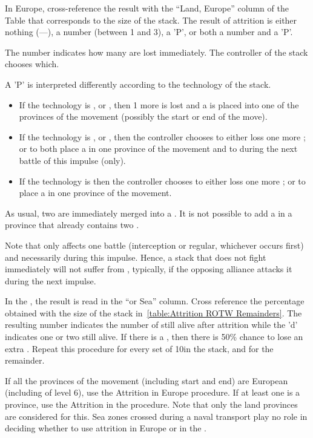 In Europe, cross-reference the result with the ``Land, Europe'' column of the
Table that corresponds to the size of the stack. The result of attrition is
either nothing (---), a number (between 1 and 3), a 'P', or both a number and
a 'P'.

The number indicates how many \LD are lost immediately. The controller of the
stack chooses which.

A 'P' is interpreted differently according to the technology of the stack.
\begin{itemize}
\item If the technology is \TMED, \TREN or \TARQ, then 1 more \LD is lost and
  a \PILLAGE\facemoins is placed into one of the provinces of the movement
  (possibly the start or end of the move).
\item If the technology is \TMUS, \TBAR or \TMAN, then the controller chooses
  to either loss one more \LD; or to both place a \PILLAGE\facemoins in one
  province of the movement and to  during the next battle of
  this impulse (only).
\item If the technology is \TL then the controller chooses
  to either loss one more \LD; or to place a \PILLAGE\facemoins in one
  province of the movement.
\end{itemize}
As usual, two \PILLAGE\Facemoins are immediately merged into a
\PILLAGE\Faceplus. It is not possible to add a \PILLAGE in a province that
already contains two \PILLAGE\Faceplus.

Note that  only affects one battle (interception or regular,
whichever occurs first) and necessarily during this impulse. Hence, a stack
that does not fight immediately will not suffer from ,
typically, if the opposing alliance attacks it during the next impulse.

\smallskip

In the \ROTW, the result is read in the ``\ROTW or Sea'' column. Cross
reference the percentage obtained with the size of the stack
in~\ref{table:Attrition ROTW Remainders}. The resulting number indicates the
number of \LD still alive after attrition while the 'd' indicates one or two
\LDE still alive. If there is a \textetoile, then there is 50\% chance to lose
an extra \LDE. Repeat this procedure for every set of 10\LD in the stack, and
for the remainder.

If all the provinces of the movement (including start and end) are European
(including \COL of level 6), use the Attrition in Europe procedure. If at
least one is a \ROTW province, use the Attrition in the \ROTW procedure. Note
that only the land provinces are considered for this. Sea zones crossed during
a naval transport play no role in deciding whether to use attrition in Europe
or in the \ROTW.


